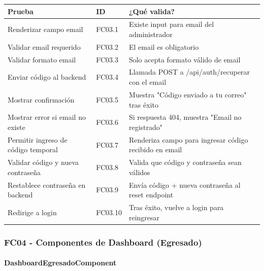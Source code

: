 \begin{table}[H]
\centering
\begin{tabular}{|l|l|p{6cm}|}
\hline
\textbf{Prueba} & \textbf{ID} & \textbf{¿Qué valida?} \\ \hline
Renderizar campo email & FC03.1 & Existe input para email del administrador \\ \hline
Validar email requerido & FC03.2 & El email es obligatorio \\ \hline
Validar formato email & FC03.3 & Solo acepta formato válido de email \\ \hline
Enviar código al backend & FC03.4 & Llamada POST a /api/auth/recuperar con el email \\ \hline
Mostrar confirmación & FC03.5 & Muestra "Código enviado a tu correo" tras éxito \\ \hline
Mostrar error si email no existe & FC03.6 & Si respuesta 404, muestra "Email no registrado" \\ \hline
Permitir ingreso de código temporal & FC03.7 & Renderiza campo para ingresar código recibido en email \\ \hline
Validar código y nueva contraseña & FC03.8 & Valida que código y contraseña sean válidos \\ \hline
Restablece contraseña en backend & FC03.9 & Envía código + nueva contraseña al reset endpoint \\ \hline
Redirige a login & FC03.10 & Tras éxito, vuelve a login para reingresar \\ \hline
\end{tabular}
\end{table}

\subsubsection{FC04 - Componentes de Dashboard (Egresado)}

\paragraph{DashboardEgresadoComponent}

